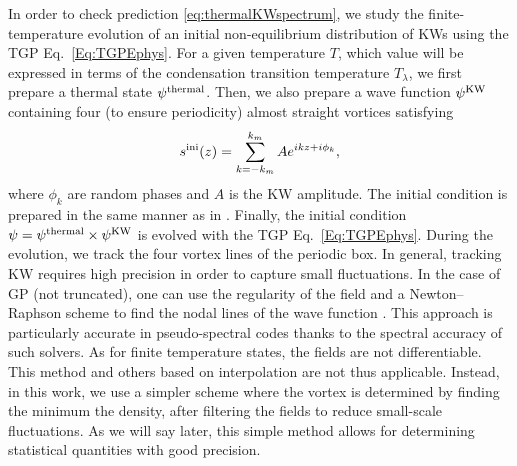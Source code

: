 \documentclass[sn-mathphys]{sn-jnl}%
\begin{document}
In order to check prediction \eqref{eq:thermalKWspectrum}, we study the finite-temperature evolution of an initial non-equilibrium distribution of KWs using the TGP Eq.~\eqref{Eq:TGPEphys}. For a given temperature $T$, which value will be expressed in terms of the condensation transition temperature $T_\lambda$, we first prepare a thermal state $\psi^{\rm thermal}$. Then, we also prepare a wave function $\psi^{\rm KW}$ containing four (to ensure periodicity) almost straight vortices satisfying
\begin{equation}
s^{\rm ini}(z)=\sum_{k={-k_m}}^{k_m} Ae^{ikz +i \phi_k},\label{eq:vortexWithKW}
\end{equation}
where $\phi_k$ are random phases and $A$ is the KW amplitude. The initial condition is prepared in the same manner as in \cite{Krstulovic_KelvinwaveCascadeDissipation_2012}. Finally, the initial condition $\psi=\psi^{\rm thermal}\times\psi^{\rm KW}$ is evolved with the TGP Eq.~\eqref{Eq:TGPEphys}. During the evolution, we track the four vortex lines of the periodic box. {In general, tracking KW requires high precision in order to capture small fluctuations. In the case of GP (not truncated), one can use the regularity of the field and a Newton–Raphson scheme to find the nodal lines of the wave function \cite{Krstulovic_KelvinwaveCascadeDissipation_2012,Villois_VortexFilamentTracking_2016}. This approach is particularly accurate in pseudo-spectral codes thanks to the spectral accuracy of such solvers. As for finite temperature states, the fields are not differentiable. This method and others based on interpolation are not thus applicable. Instead, in this work, we use a simpler scheme where the vortex is determined by finding the minimum the density, after filtering the fields to reduce small-scale fluctuations. As we will say later, this simple method allows for determining statistical quantities with good precision.}


\end{document}
